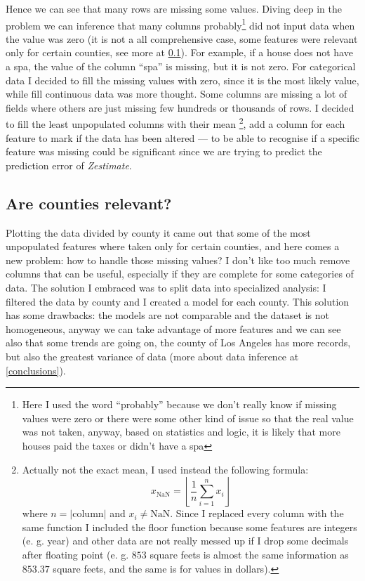 Hence we can see that many rows are missing some values. Diving deep in the problem we can inference that many columns probably\footnote{Here I used the word ``probably'' because we don't really know if missing values were zero or there were some other kind of issue so that the real value was not taken, anyway, based on statistics and logic, it is likely that more houses paid the taxes or didn't have a spa} did not input data when the value was zero (it is not a all comprehensive case, some features were relevant only for certain counties, see more at \ref{counties_importance}). For example, if a house does not have a spa, the value of the column ``spa'' is missing, but it is not zero. For categorical data I decided to fill the missing values with zero, since it is the most likely value, while fill continuous data was more thought. Some columns are missing a lot of fields where others are just missing few hundreds or thousands of rows. I decided to fill the least unpopulated columns with their mean
\footnote{Actually not the exact mean, I used instead the following formula:
$$
    x_{\text{NaN}} = \left\lfloor \frac{1}{n} \sum_{i=1}^{n} x_i \right\rfloor
$$
where $n = |\text{column}|$ and $x_i \neq \text{NaN}$. Since I replaced every column with the same function I included the floor function because some features are integers (e. g. year) and other data are not really messed up if I drop some decimals after floating point (e. g. $853$ square feets is almost the same information as $853.37$ square feets, and the same is for values in dollars).},
add a column for each feature to mark if the data has been altered --- to be able to recognise if a specific feature was missing could be significant since we are trying to predict the prediction error of \textit{Zestimate}. %

\subsection{Are counties relevant?}\label{counties_importance}

Plotting the data divided by county it came out that some of the most unpopulated features where taken only for certain counties, and here comes a new problem: how to handle those missing values? I don't like too much remove columns that can be useful, especially if they are complete for some categories of data. The solution I embraced was to split data into specialized analysis: I filtered the data by county and I created a model for each county.
This solution has some drawbacks: the models are not comparable and the dataset is not homogeneous, anyway we can take advantage of more features and we can see also that some trends are going on, the county of Los Angeles has more records, but also the greatest variance of data (more about data inference at \ref{conclusions}).


